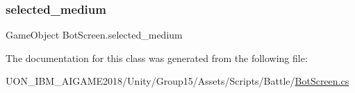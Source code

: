 \subsubsection{\texorpdfstring{selected\_medium}{selected\_medium}}
{\footnotesize\ttfamily Game\+Object Bot\+Screen.\+selected\+\_\+medium\hspace{0.3cm}{\ttfamily [private]}}



The documentation for this class was generated from the following file\+:\begin{DoxyCompactItemize}
\item 
U\+O\+N\+\_\+\+I\+B\+M\+\_\+\+A\+I\+G\+A\+M\+E2018/\+Unity/\+Group15/\+Assets/\+Scripts/\+Battle/\mbox{\hyperlink{_bot_screen_8cs}{Bot\+Screen.\+cs}}\end{DoxyCompactItemize}
